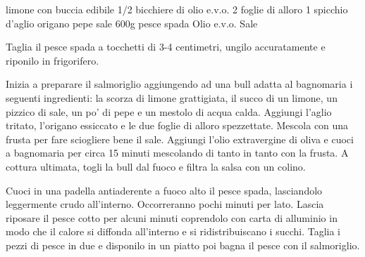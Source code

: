 \begin{ingreds}
	 limone con buccia edibile
	1/2 bicchiere di olio e.v.o.
	2 foglie di alloro
	1 spicchio d'aglio
	origano
	pepe
	sale
\columnbreak
     	600g pesce spada
     	Olio e.v.o.
	Sale
\end{ingreds}

\begin{method}
Taglia il pesce spada a tocchetti di 3-4 centimetri, ungilo accuratamente e riponilo in frigorifero.

Inizia a preparare il salmoriglio aggiungendo ad una bull adatta al bagnomaria i seguenti ingredienti: la scorza di limone grattigiata, il succo di un limone, un pizzico di sale, un po' di pepe e un mestolo di acqua calda. Aggiungi l'aglio tritato, l'origano essiccato e le due foglie di alloro spezzettate. Mescola con una frusta per fare sciogliere bene il sale. Aggiungi l'olio extravergine di oliva e cuoci a bagnomaria per circa 15 minuti mescolando di tanto in tanto con la frusta. A cottura ultimata, togli la bull dal fuoco e filtra la salsa con un colino.

Cuoci in una padella antiaderente a fuoco alto il pesce spada, lasciandolo leggermente crudo all'interno. Occorreranno pochi minuti per lato. Lascia riposare il pesce cotto per alcuni minuti coprendolo con carta di alluminio in modo che il calore si diffonda all'interno e si ridistribuiscano i succhi. Taglia i pezzi di pesce in due e disponilo in un piatto poi bagna il pesce con il salmoriglio.

\end {method}



